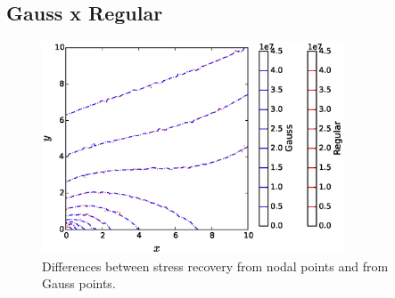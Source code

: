 \documentclass[11pt, a4paper]{article}
\numberwithin{equation}{section}
\begin{document}
\subsection{Gauss x Regular}


\begin{figure}[H]
\centering
		\includegraphics[width=0.8\textwidth]{fig/gauss_x_regular.eps}
		\caption{}
		\label{fig:1}
	\caption{Differences between stress recovery from nodal points and from Gauss points.}
	\label{fig:3_1}
\end{figure}
\end{document}
